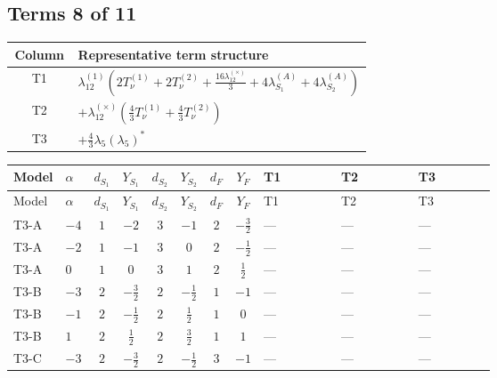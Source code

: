\documentclass[8pt]{article}
\begin{document}
\begin{landscape}
\subsection*{Terms 8 of 11}
\begin{center}
\begin{tabular}{@{}c >{\raggedright\arraybackslash}p{0.82\linewidth}@{}}
\toprule
Column & Representative term structure \\
\midrule
T1 & \(\displaystyle {\lambda_{12}^{(1)}} \left(2 T_{\nu}^{(1)}+2 T_{\nu}^{(2)}+\frac{16 {\lambda_{12}^{(\times)}}}{3}+4 {\lambda_{S_1}^{(A)}}+4 {\lambda_{S_2}^{(A)}}\right)\) \\
\midrule
T2 & \(\displaystyle +{\lambda_{12}^{(\times)}} \left(\frac{4}{3} T_{\nu}^{(1)}+\frac{4}{3} T_{\nu}^{(2)}\right)\) \\
\midrule
T3 & \(\displaystyle +\frac{4}{3} {\lambda_5} \left({\lambda_5}\right)^{*}\) \\
\midrule
\bottomrule
\end{tabular}
\end{center}
\smallskip
\tiny
\begin{longtable}{@{}llcccccc >{\raggedright\arraybackslash}p{0.21\linewidth} >{\raggedright\arraybackslash}p{0.21\linewidth} >{\raggedright\arraybackslash}p{0.21\linewidth}@{}}
\toprule
Model & $\alpha$ & $d_{S_1}$ & $Y_{S_1}$ & $d_{S_2}$ & $Y_{S_2}$ & $d_F$ & $Y_F$ & T1 & T2 & T3 \\
\midrule
\endfirsthead
\toprule
Model & $\alpha$ & $d_{S_1}$ & $Y_{S_1}$ & $d_{S_2}$ & $Y_{S_2}$ & $d_F$ & $Y_F$ & T1 & T2 & T3 \\
\midrule
\endhead
T3-A & $-4$ & $1$ & $-2$ & $3$ & $-1$ & $2$ & $-\frac{3}{2}$ & --- & --- & --- \\
\midrule
T3-A & $-2$ & $1$ & $-1$ & $3$ & $0$ & $2$ & $-\frac{1}{2}$ & --- & --- & --- \\
\midrule
T3-A & $0$ & $1$ & $0$ & $3$ & $1$ & $2$ & $\frac{1}{2}$ & --- & --- & --- \\
\midrule
T3-B & $-3$ & $2$ & $-\frac{3}{2}$ & $2$ & $-\frac{1}{2}$ & $1$ & $-1$ & --- & --- & --- \\
\midrule
T3-B & $-1$ & $2$ & $-\frac{1}{2}$ & $2$ & $\frac{1}{2}$ & $1$ & $0$ & --- & --- & --- \\
\midrule
T3-B & $1$ & $2$ & $\frac{1}{2}$ & $2$ & $\frac{3}{2}$ & $1$ & $1$ & --- & --- & --- \\
\midrule
T3-C & $-3$ & $2$ & $-\frac{3}{2}$ & $2$ & $-\frac{1}{2}$ & $3$ & $-1$ & --- & --- & --- \\

\end{longtable}
\end{landscape}
\end{document}

